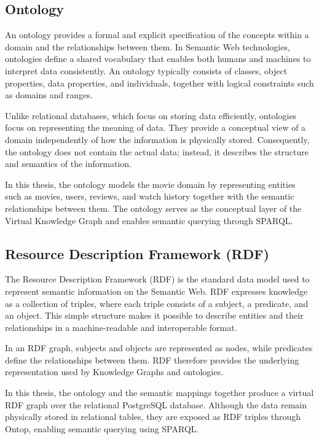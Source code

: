 \subsection{Ontology}
An ontology provides a formal and explicit specification of the concepts within a domain and the relationships between them. In Semantic Web technologies, ontologies define a shared vocabulary that enables both humans and machines to interpret data consistently. An ontology typically consists of classes, object properties, data properties, and individuals, together with logical constraints such as domains and ranges.

Unlike relational databases, which focus on storing data efficiently, ontologies focus on representing the meaning of data. They provide a conceptual view of a domain independently of how the information is physically stored. Consequently, the ontology does not contain the actual data; instead, it describes the structure and semantics of the information.

In this thesis, the ontology models the movie domain by representing entities such as movies, users, reviews, and watch history together with the semantic relationships between them. The ontology serves as the conceptual layer of the Virtual Knowledge Graph and enables semantic querying through SPARQL.

\subsection{Resource Description Framework (RDF)}

The Resource Description Framework (RDF) is the standard data model used to represent semantic information on the Semantic Web. RDF expresses knowledge as a collection of triples, where each triple consists of a subject, a predicate, and an object. This simple structure makes it possible to describe entities and their relationships in a machine-readable and interoperable format.

In an RDF graph, subjects and objects are represented as nodes, while predicates define the relationships between them. RDF therefore provides the underlying representation used by Knowledge Graphs and ontologies.

In this thesis, the ontology and the semantic mappings together produce a virtual RDF graph over the relational PostgreSQL database. Although the data remain physically stored in relational tables, they are exposed as RDF triples through Ontop, enabling semantic querying using SPARQL.


